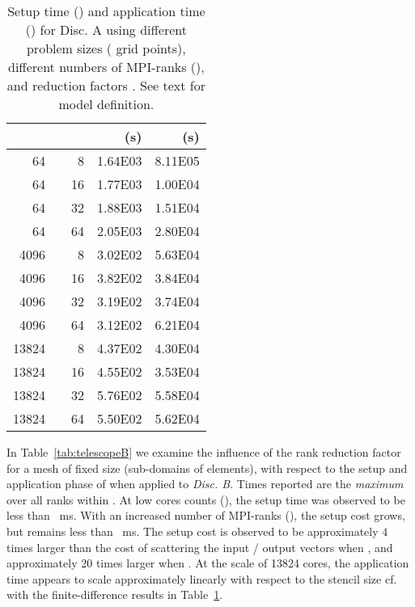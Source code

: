 \documentclass[]{siamart0216}
\begin{document}
\begin{table}[h!]
\centering
\caption{Setup time () and application time () for Disc. A using different problem sizes ( grid points), different numbers of MPI-ranks (), and reduction factors .
See text for model definition.}
\begin{tabular}{r r r r r}
\toprule
     &    &    & (s) & (s)\\
\toprule
64                       &         &8            &1.64E03 &8.11E05   \\
64                       &         &16          &1.77E03 &1.00E04   \\
64                       &         &32          &1.88E03 &1.51E04   \\
64                       &         &64          &2.05E03 &2.80E04   \\
\midrule
4096                    &      &8         &3.02E02 &5.63E04   \\
4096                    &      &16       &3.82E02 &3.84E04   \\
4096                    &      &32       &3.19E02 &3.74E04   \\
4096                    &      &64       &3.12E02 &6.21E04   \\
\midrule
13824                  &         &8            &4.37E02 &4.30E04   \\
13824                  &         &16          &4.55E02 &3.53E04   \\
13824                  &         &32          &5.76E02 &5.58E04   \\
13824                  &         &64          &5.50E02 &5.62E04   \\
\bottomrule
\end{tabular}
\label{tab:telescopeA}
\end{table}

In Table~\ref{tab:telescopeB} we examine the influence of the rank reduction factor  for a mesh of fixed size 
(sub-domains of  elements), with respect to the setup and application phase 
of  when applied to \emph{Disc. B}.
Times reported are the \textit{maximum} over all ranks within .
At low cores counts (), the setup time was observed to be less than ~ms. 
With an increased number of MPI-ranks (), the setup cost grows, but remains less than ~ms.
The setup cost is observed to be approximately 4 times larger than the cost of scattering the input / output vectors 
when , and approximately 20 times larger when . 
At the scale of 13824 cores, the application time appears to scale approximately linearly with respect to the stencil size cf. 
with the finite-difference results in Table~\ref{tab:telescopeA}.
\end{document}
